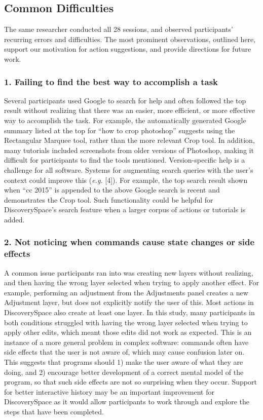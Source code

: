 \subsection{Common Difficulties}
The same researcher conducted all 28 sessions, and observed participants' recurring errors and difficulties. The most prominent observations, outlined here, support our motivation for action suggestions, and provide directions for future work.

\subsubsection{1. Failing to find the best way to accomplish a task}
Several participants used Google to search for help and often followed the top result without realizing that there was an easier, more efficient, or more effective way to accomplish the task. For example, the automatically generated Google summary listed at the top for ``how to crop photoshop'' suggests using the Rectangular Marquee tool, rather than the more relevant Crop tool. In addition, many tutorials included screenshots from older versions of Photoshop, making it difficult for participants to find the tools mentioned. Version-specific help is a challenge for all software. Systems for augmenting search queries with the user's context could improve this (\textit{e.g.} [4]). For example, the top search result shown when ``cc 2015'' is appended to the above Google search is recent and demonstrates the Crop tool. Such functionality could be helpful for Discovery\-Space's search feature when a larger corpus of actions or tutorials is added.

\subsubsection{2. Not noticing when commands cause state changes or side effects}
A common issue participants ran into was creating new layers without realizing, and then having the wrong layer selected when trying to apply another effect. For example, performing an adjustment from the Adjustments panel creates a new Adjustment layer, but does not explicitly notify the user of this. Most actions in Discovery\-Space also create at least one layer. In this study, many participants in both conditions struggled with having the wrong layer selected when trying to apply other edits, which meant those edits did not work as expected. This is an instance of a more general problem in complex software: commands often have side effects that the user is not aware of, which may cause confusion later on. This suggests that programs should 1) make the user aware of what they are doing, and 2) encourage better development of a correct mental model of the program, so that such side effects are not so surprising when they occur. Support for better interactive history may be an important improvement for Discovery\-Space as it would allow participants to work through and explore the steps that have been completed.

